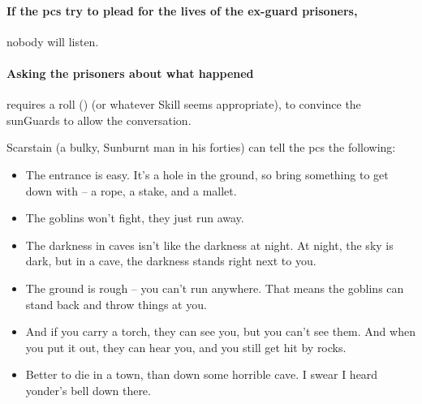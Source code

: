 \begin{multicols}{2}
\paragraph{If the \glspl{pc} try to plead for the lives of the ex-\gls{guard} prisoners,}
nobody will listen.


\paragraph{Asking the prisoners about what happened}
requires a  roll (\tn[8]) (or whatever Skill seems appropriate), to convince the \glspl{sunGuard} to allow the conversation.

Scarstain (a bulky, Sunburnt man in his forties) can tell the \glspl{pc} the following:

\begin{itemize}
  \item
  The entrance is easy.
  It's a hole in the ground, so bring something to get down with -- a rope, a stake, and a mallet.
  \item
  The goblins won't fight, they just run away.
  \item
  The darkness in caves isn't like the darkness at night.
  At night, the sky is dark, but in a cave, the darkness stands right next to you.
  \item
  The ground is rough -- you can't run anywhere.
  That means the goblins can stand back and throw things at you.
  \item
  And if you carry a torch, they can see you, but you can't see them.
  And when you put it out, they can hear you, and you still get hit by rocks.
  \item
  Better to die in a town, than down some horrible cave.
  I swear I heard \gls{yonder}'s bell down there.
\end{itemize}



\end{multicols}
